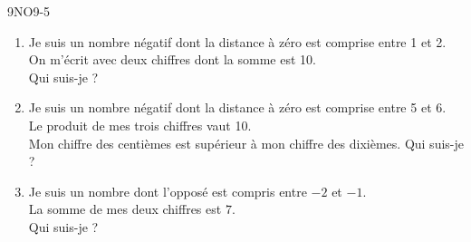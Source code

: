 \documentclass[a4paper,12pt]{report}
\begin{document}
\begin{EXO}{}{9NO9-5}


\begin{enumerate}[itemsep=2em]
	\item Je suis un nombre négatif dont la distance à zéro est comprise entre 1 et 2.\\On m'écrit avec deux chiffres dont la somme est 10.\\Qui suis-je ?
	\item Je suis un nombre négatif dont la distance à zéro est comprise entre 5 et 6.\\Le produit de mes trois chiffres vaut 10.\\Mon chiffre des centièmes est supérieur à mon chiffre des dixièmes. Qui suis-je ?
	\item Je suis un nombre dont l'opposé est compris entre $-2$ et $-1$.\\La somme de mes deux chiffres est $7$.\\Qui suis-je ?
\end{enumerate}
\end{EXO}
\end{document}
